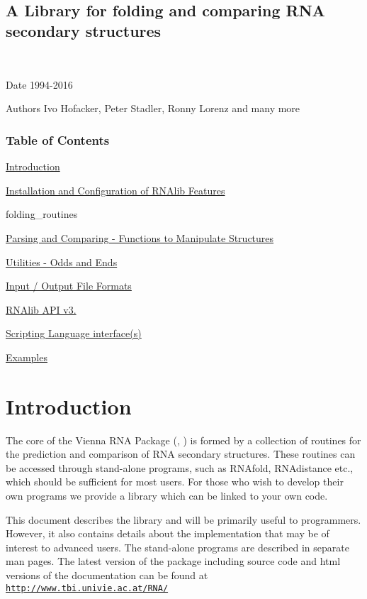 ~\newline
 

\subsection*{A Library for folding and comparing R\+NA secondary structures}



~\newline
 \begin{DoxyDate}{Date}
1994-\/2016 
\end{DoxyDate}
\begin{DoxyAuthor}{Authors}
Ivo Hofacker, Peter Stadler, Ronny Lorenz and many more
\end{DoxyAuthor}
\subsubsection*{Table of Contents}





\begin{DoxyItemize}
\item \hyperlink{index_mp_intro}{Introduction} \item \hyperlink{install}{Installation and Configuration of R\+N\+Alib Features} \item folding\+\_\+routines \item \hyperlink{mp_parse}{Parsing and Comparing -\/ Functions to Manipulate Structures} \item \hyperlink{mp_utils}{Utilities -\/ Odds and Ends} \item \hyperlink{file_formats}{Input / Output File Formats} \item \hyperlink{newAPI}{R\+N\+Alib A\+PI v3.} \item \hyperlink{scripting}{Scripting Language interface(s)} \item \hyperlink{mp_example}{Examples}\end{DoxyItemize}


\hypertarget{index_mp_intro}{}\section{Introduction}\label{index_mp_intro}
The core of the Vienna R\+NA Package (\cite{lorenz:2011}, \cite{hofacker:1994}) is formed by a collection of routines for the prediction and comparison of R\+NA secondary structures. These routines can be accessed through stand-\/alone programs, such as R\+N\+Afold, R\+N\+Adistance etc., which should be sufficient for most users. For those who wish to develop their own programs we provide a library which can be linked to your own code.

This document describes the library and will be primarily useful to programmers. However, it also contains details about the implementation that may be of interest to advanced users. The stand-\/alone programs are described in separate man pages. The latest version of the package including source code and html versions of the documentation can be found at ~\newline
~\newline
\href{http://www.tbi.univie.ac.at/RNA/}{\tt http\+://www.\+tbi.\+univie.\+ac.\+at/\+R\+N\+A/} 